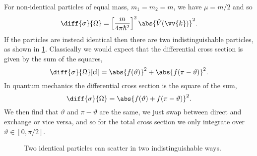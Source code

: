 \documentclass[fleqn]{NotesClass}
\begin{document}
    For non-identical particles of equal mass, \(m_1 = m_2 = m\), we have \(\mu = m/2\) and so
    \begin{equation}
        \diff{\sigma}{\Omega} = \left[ \frac{m}{4\pi\hbar^2} \right]^2 \abs{\tilde{V}(\vv{k})}^2.
    \end{equation}
    If the particles are instead identical then there are two indistinguishable particles, as shown in \cref{fig:identical particle scattering}.
    Classically we would expect that the differential cross section is given by the sum of the squares,
    \begin{equation}
        \diff{\sigma}{\Omega}[\mathrm{cl}] = \abs{f(\vartheta)}^2 + \abs{f(\pi - \vartheta)}^2.
    \end{equation}
    In quantum mechanics the differential cross section is the square of the sum,
    \begin{equation}
        \diff{\sigma}{\Omega} = \abs{f(\vartheta) + f(\pi - \vartheta)}^2.
    \end{equation}
    We then find that \(\vartheta\) and \(\pi - \vartheta\) are the same, we just swap between direct and exchange or vice versa, and so for the total cross section we only integrate over \(\vartheta \in [0, \pi/2]\).
    
    \begin{figure}
        \caption{Two identical particles can scatter in two indistinguishable ways.}
        \label{fig:identical particle scattering}
    \end{figure}
    
\end{document}
